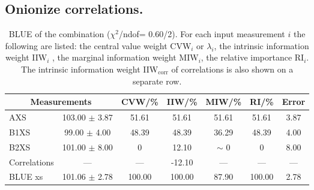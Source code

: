 \subsection{Onionize correlations.}
\begin{table}[H]
\scriptsize
\begin{center}
\renewcommand{\arraystretch}{1.1}
\begin{tabular}{|lc|c|c|c|c|c|}
\hline
\multicolumn{2}{|c|}{Measurements} & CVW/\%  & IIW/\%  & MIW/\%  & RI/\%  & {\tiny Error}\\
\hline
AXS &     103.00 $\pm$       3.87 &      51.61 &      51.61 &      51.61 &      51.61 &       3.87\\
B1XS &      99.00 $\pm$       4.00 &      48.39 &      48.39 &      36.29 &      48.39 &       4.00\\
B2XS &     101.00 $\pm$       8.00 &  0 &      12.10 &  {\tiny $\sim$ }0 &  0 &       8.00\\
Correlations & --- & --- &     -12.10 & --- & --- & ---\\
\hline
BLUE {\tiny xs} &     101.06 $\pm$       2.78 &     100.00 &     100.00 &      87.90 &     100.00 &       2.78\\
\hline
\end{tabular}
\caption{BLUE of the combination ($\chi^2$/ndof=      0.60/2).
 For each input measurement $i$ the following are listed: the central value weight CVW$_i$ or $\lambda_i$, the intrinsic information weight IIW$_i$ , the marginal information weight MIW$_i$, the relative importance RI$_i$. The intrinsic information weight IIW$_{\mathrm{corr}}$ of correlations is also shown on a separate row.}
\renewcommand{\arraystretch}{1}
\end{center}
\end{table}
